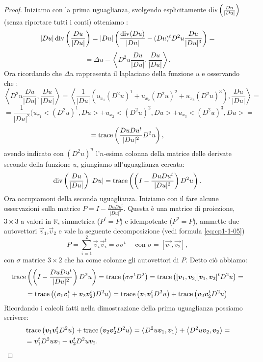 \begin{proof}
Iniziamo con la prima uguaglianza, svolgendo esplicitamente $\operatorname{div}\left(\frac{Du}{|Du|}\right)$ (senza riportare tutti i conti) otteniamo :
\[
|Du|\operatorname{div}\left(\frac{Du}{|Du|}\right)=|Du|\left(\frac{\operatorname{div}(Du)}{|Du|} -(Du)^tD^2u\frac{Du}{|Du|^3}\right) =
\]
\[
= \Delta u - \left<D^2u\frac{Du}{|Du|},\frac{Du}{|Du|}\right> .
\]
Ora ricordando che $\Delta u$ rappresenta il laplaciano della funzione $u$ e osservando che :
\[
\left<D^2u\frac{Du}{|Du|},\frac{Du}{|Du|}\right> = \left<\frac{1}{|Du|}(u_{x_1}(D^2u)^1+u_{x_2}(D^2u)^2+u_{x_3}(D^2u)^3),\frac{Du}{|Du|}\right> =
\]
\[
=\frac{1}{|Du|^2}(u_{x_1}<(D^2u)^1,Du>+u_{x_2}<(D^2u)^2,Du>+u_{x_3}<(D^2u)^3,Du> = 
\]
\[
=\operatorname{trace}\left(\frac{DuDu^t}{|Du|^2}D^2u\right),
\]
avendo indicato con $(D^2u)^n$ l'$n$-esima colonna della matrice delle derivate seconde della funzione $u$, giungiamo all'uguaglianza cercata:
\[
\operatorname{div}\left(\frac{Du}{|Du|}\right)|Du| = \operatorname{trace}\left(\left(I-{\frac{DuDu^t}{|Du|^2}}\right)D^2u\right).
\] 
Ora occupiamoni della seconda uguaglianza. Iniziamo con il fare alcune osservazioni sulla matrice $P=I-\frac{DuDu^t}{|Du|^2}$. Questa è una matrice di proiezione, $3\times3$ a valori in $\mathbb{R}$, simmetrica ($P^t=P$) e idempotente ($P^2=P$), ammette due autovettori $\vec{v}_1$,$\vec{v}_2$ e vale la seguente decomposizione (vedi formula \eqref{eq:cp1-1-05})
\[
P=\sum_{i=1}^2\vec{v}_i\vec{v}_i^t=\sigma\sigma^t\quad\text{ con } \sigma=[\vec{v_1},\vec{v_2}],
\]
con $\sigma$ matrice $3\times2$ che ha come colonne gli autovettori di $P$. Detto ciò abbiamo: 
\[
\operatorname{trace}\left(\left(I-{\frac{DuDu^t}{|Du|^2}}\right)D^2u\right)=\operatorname{trace}\left(\sigma\sigma^tD^2\right)=\operatorname{trace}\left([\bm{v}_1,\bm{v}_2][\bm{v}_1,\bm{v}_2]^tD^2u\right)=
\]
\[
=\operatorname{trace}\left((\bm{v}_1\bm{v}_1^t+\bm{v}_2\bm{v}_2^t)D^2u\right)=\operatorname{trace}\left(\bm{v}_1\bm{v}_1^tD^2u\right)+\operatorname{trace}\left(\bm{v}_2\bm{v}_2^tD^2u\right)
\]
Ricordando i calcoli fatti nella dimostrazione della prima uguaglianza possiamo scrivere:
\[
\begin{split}
&\operatorname{trace}\left(\bm{v}_1\bm{v}_1^tD^2u\right)+\operatorname{trace}\left(\bm{v}_2\bm{v}_2^tD^2u\right)=\left<D^2u\bm{v}_1,\bm{v}_1\right>+\left<D^2u\bm{v}_2,\bm{v}_2\right>=\\
& =\bm{v}_1^tD^2u\bm{v}_1+\bm{v}_2^tD^2u\bm{v}_2.
\end{split}
\]
\end{proof}

